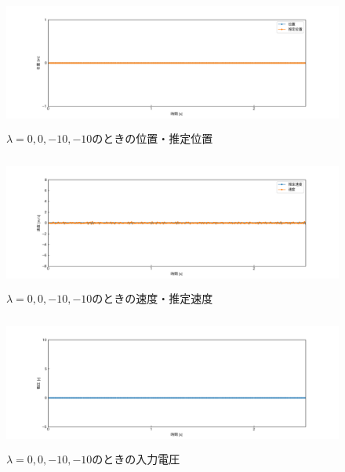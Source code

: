 \documentclass[12pt]{jsarticle}
\begin{document}
\begin{figure}[H]
  \begin{center}
    \includegraphics[clip,width=13.0cm, height=4.4cm]{../img/Exp8-1.png}
    \caption{$\lambda=0, 0, -10, -10$のときの位置・推定位置}
    \label{Exp8-1}
  \end{center}
\end{figure}
\begin{figure}[H]
  \begin{center}
    \includegraphics[clip,width=13.0cm, height=4.4cm]{../img/Exp8-2.png}
    \caption{$\lambda=0, 0, -10, -10$のときの速度・推定速度}
    \label{Exp8-2}
  \end{center}
\end{figure}
\begin{figure}[H]
  \begin{center}
    \includegraphics[clip,width=13.0cm, height=4.4cm]{../img/Exp8-3.png}
    \caption{$\lambda=0, 0, -10, -10$のときの入力電圧}
    \label{Exp8-3}
  \end{center}
\end{figure}
\end{document}
